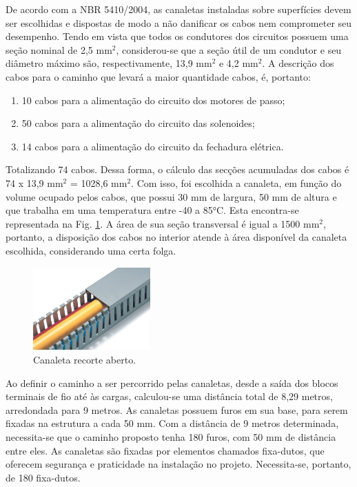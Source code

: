 De acordo com a NBR 5410/2004, as canaletas instaladas sobre superfícies devem ser escolhidas e dispostas de modo a não danificar os cabos nem comprometer seu desempenho. Tendo em vista que todos os condutores dos circuitos possuem uma seção nominal de 2,5 $\text{mm}^2$, considerou-se que a seção útil de um condutor e seu diâmetro máximo são, respectivamente, 13,9 $\text{mm}^2$ e 4,2 $\text{mm}^2$. A descrição dos cabos para o caminho que levará a maior quantidade cabos, é, portanto:

\begin{enumerate}
    \item 10 cabos para a alimentação do circuito dos motores de passo;
    \item 50 cabos para a alimentação do circuito das solenoides;
    \item 14 cabos para a alimentação do circuito da fechadura elétrica.
\end{enumerate}

Totalizando 74 cabos. Dessa forma, o cálculo das secções acumuladas dos cabos é 74 x 13,9 $\text{mm}^2$ = 1028,6 $\text{mm}^2$. Com isso, foi escolhida a canaleta, em função do volume ocupado pelos cabos, que possui 30 mm de largura, 50 mm de altura e que trabalha em uma temperatura entre -40 a 85°C. Esta encontra-se representada na Fig. \ref{fig:energia_canaleta}. A área de sua seção transversal é igual a 1500 $\text{mm}^2$, portanto, a disposição dos cabos no interior atende à área disponível da canaleta escolhida, considerando uma certa folga. 

\begin{figure}[H]
\centering
    \includegraphics[width=0.4\textwidth]{figuras/energia/fotos_componentes/canaleta.png}
    \caption{Canaleta recorte aberto.}
    \label{fig:energia_canaleta}
\end{figure}

Ao definir o caminho a ser percorrido pelas canaletas, desde a saída dos blocos terminais de fio até às cargas, calculou-se uma distância total de 8,29 metros, arredondada para 9 metros. As canaletas possuem furos em sua base, para serem fixadas na estrutura a cada 50 mm. Com a distância de 9 metros determinada, necessita-se que o caminho proposto tenha 180 furos, com 50 mm de distância entre eles. As canaletas são fixadas por elementos chamados fixa-dutos, que oferecem segurança e praticidade na instalação no projeto. Necessita-se, portanto, de 180 fixa-dutos. 


